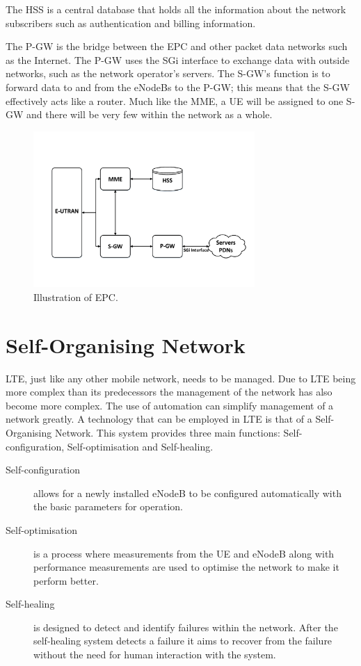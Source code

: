 The HSS is a central database that holds all the information about the network subscribers such as authentication and billing information.

The P-GW is the bridge between the EPC and other packet data networks such as the Internet. The P-GW uses the SGi interface to exchange data with outside networks, such as the network operator's servers.
The S-GW's function is to forward data to and from the eNodeBs to the P-GW; this means that the S-GW effectively acts like a router. Much like the MME, a UE will be assigned to one S-GW and there will be very few within the network as a whole.~\cite{cox2012introduction, 3gpp2013network}
\begin{figure}[H]
  \begin{center}
    	  \includegraphics[width=0.75\textwidth]{figures/lte/epc.pdf}
    \end{center}
    \caption{Illustration of EPC.}
    \label{fig:epc}
\end{figure}
\section{Self-Organising Network}\label{self organising network}
LTE, just like any other mobile network, needs to be managed. Due to LTE being more complex than its predecessors the management of the network has also become more complex. The use of automation can simplify management of a network greatly. A technology that can be employed in LTE is that of a Self-Organising Network. This system provides three main functions: Self-configuration, Self-optimisation and Self-healing.~\cite{feng2008self,3gpp2011self}
\begin{description}
  \item[Self-configuration] allows for a newly installed eNodeB to be configured automatically with the basic parameters for operation.  
  \item[Self-optimisation] is a process where measurements from the UE and eNodeB along with performance measurements are used to optimise the network to make it perform better.
  \item[Self-healing] is designed to detect and identify failures within the network. After the self-healing system detects a failure it aims to recover from the failure without the need for human interaction with the system.
\end{description}
